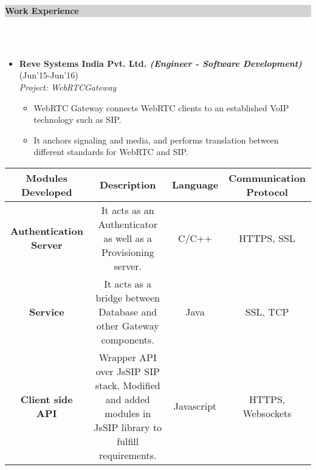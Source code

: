 \documentclass[a4paper,10pt]{article}
\newcommand{\lsep}{-0.5cm}
\newcommand{\hsep}{-0.6cm}
\newcommand{\resheading}[1]{{\small \colorbox{lightgray}{\begin{minipage}{0.975\textwidth}{\textbf{#1 \vphantom{p\^{E}}}}\end{minipage}}}}
\begin{document}
\resheading{\textbf{\large Work Experience}}\\[\lsep] \\[-0.4cm]
\begin{itemize}
\item \textbf{  Reve Systems India Pvt. Ltd. \emph{(Engineer - Software Development)} }  \hfill  (Jun'15-Jun'16) \\
	 \emph{Project: WebRTCGateway }	 \\ [\hsep]
     \begin{itemize}
     \item  WebRTC Gateway connects WebRTC clients to an established VoIP technology such as SIP. \\[\hsep]
     \item It anchors signaling and media, and performs translation between different standards for WebRTC and SIP.\vspace*{-5mm}
     \end{itemize}

    \end{itemize}
    
    
     \begin{table}[h!]\centering 
          
            \begin{tabular}{ c  c c  c } 
            \toprule[0.01pt]
            \textbf{Modules Developed} & \textbf{Description} &   	\textbf{Language}   & 	\textbf{Communication Protocol}  \\ \midrule[0.01pt]
            
       \rowcolor{Gray}      \textbf{Authentication Server} & \multicolumn{1}{m{6.4cm}}{It acts as an Authenticator as well as a Provisioning server.} &  C/C++ &  HTTPS, SSL \\
            
            \textbf{Service} &  \multicolumn{1}{m{6.4cm}}{ It acts as a bridge between Database and other Gateway components.} & Java & SSL, TCP \\  
            
      \rowcolor{Gray}       \textbf{Client side API} & \multicolumn{1}{m{6.4cm}}{Wrapper API over JsSIP SIP stack. \newline Modified and added modules in JsSIP \newline library to fulfill requirements.} & 	Javascript 	&	 HTTPS, Websockets \\ \bottomrule[0.01pt]
            
     \end{tabular} 
     \end{table}    \vspace{-0.2cm}
\end{document}
